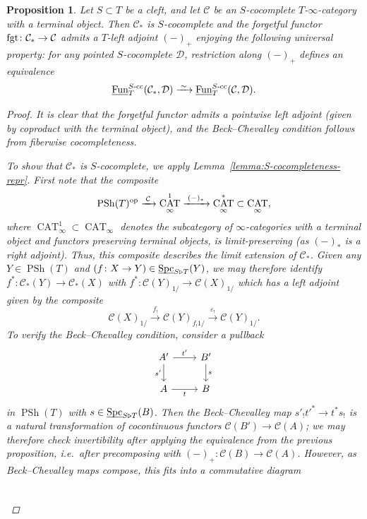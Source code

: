 \documentclass[reqno]{memo-l}
\theoremstyle{mythm}
\newtheorem{prop}[thm]{Proposition}
\theoremstyle{definition}
\numberwithin{equation}{section}
\newcommand{\Cc}{{\mathcal{C}}}
\newcommand{\Dd}{{\mathcal{D}}}
\renewcommand{\epsilon}{\varepsilon}
\DeclareMathOperator{\Spc}{Spc}
\DeclareMathOperator{\CAT}{CAT}
\newcommand{\Fun}{{\textup{Fun}}}
\DeclareMathOperator{\PSh}{PSh}
\newcommand{\op}{{\textup{op}}}
\newcommand{\fgt}{\textup{fgt}}
\newcommand{\ulhelper}[2]{\underline{\setbox0=\hbox{$#1#2$}\dp0=0.4pt \box0\relax}}
\newcommand{\ul}[1]{{\mathpalette\ulhelper{#1}}\hbox{\rule[-2pt]{0pt}{0pt}}}
\newcommand{\iso}{\xrightarrow{\;\smash{\raisebox{-0.25ex}{\ensuremath{\scriptstyle\sim}}}\;}}
\begin{document}
\begin{prop}\label{prop:univ-prop-*-cc-param}
    Let $S\subset T$ be a cleft, and let $\Cc$ be an $S$-cocomplete $T$-$\infty$-category with a terminal object. Then $\Cc_*$ is $S$-cocomplete and the forgetful functor $\fgt\colon\Cc_*\to\Cc$ admits a $T$-left adjoint $(-)_+$ enjoying the following universal property: for any pointed $S$-cocomplete $\Dd$, restriction along $(-)_+$ defines an equivalence
    \[
        \ul\Fun^\textup{$S$-cc}_T(\Cc_*,\Dd)\iso
        \ul\Fun^\textup{$S$-cc}_T(\Cc,\Dd).
    \]
    \begin{proof}
        It is clear that the forgetful functor admits a pointwise left adjoint (given by coproduct with the terminal object), and the Beck--Chevalley condition follows from fiberwise cocompleteness.

        To show that $\Cc_*$ is $S$-cocomplete, we apply Lemma~\ref{lemma:S-cocompleteness-repr}. First note that the composite
        \[
            \PSh(T)^\op\xrightarrow{\;\Cc\;}\CAT_\infty^1\xrightarrow{\;(-)_*\;}\CAT_\infty^*\subset\CAT_\infty,
        \]
        where $\CAT_\infty^1\subset\CAT_\infty$ denotes the subcategory of $\infty$-categories with a terminal object and functors preserving terminal objects, is limit-preserving (as $(-)_*$ is a right adjoint). Thus, this composite describes the limit extension of $\Cc_*$. Given any $Y\in\PSh(T)$ and $(f\colon X\to Y)\in\ul\Spc_{S\triangleright T}(Y)$, we may therefore identify $f^*\colon\Cc_*(Y)\to\Cc_*(X)$ with $f^*\colon\Cc(Y)_{1/}\to\Cc(X)_{1/}$ which has a left adjoint given by the composite
        \[
            \Cc(X)_{1/}\xrightarrow{\;f_!\;}\Cc(Y)_{f_!1/}\xrightarrow{\;\epsilon_!\;}\Cc(Y)_{1/}.
        \]
        To verify the Beck--Chevalley condition, consider a pullback
        \[
            \begin{tikzcd}
                A'\arrow[r, "t'"]\arrow[d,"s'"'] & B'\arrow[d,"s"]\\
                A\arrow[r,"t"'] & B
            \end{tikzcd}
        \]
        in $\PSh(T)$ with $s\in\ul\Spc_{S\triangleright T}(B)$. Then the Beck--Chevalley map $s'_!t'^*\to t^*s_!$ is a natural transformation of cocontinuous functors $\Cc(B')\to\Cc(A)$; we may therefore check invertibility after applying the equivalence from the previous proposition, i.e.\ after precomposing with $(-)_+\colon\Cc(B)\to\Cc(A)$. However, as Beck--Chevalley maps compose, this fits into a commutative diagram
        \[
            \begin{tikzcd}

\end{tikzcd}\]
\end{proof}
\end{prop}
\end{document}
